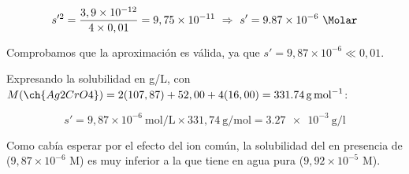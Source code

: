 \begin{exerciseEVAU}
\begin{solu}
        \begin{equation*}
            s'^2 = \dfrac{3,9 \times 10^{-12}}{4 \times 0,01} = 9,75 \times 10^{-11} \ \Rightarrow \ s' = \num{9.87e-6} \ \si{\Molar}
        \end{equation*}

        Comprobamos que la aproximación es válida, ya que \(s' = 9,87 \times 10^{-6} \ll 0,01\).

        Expresando la solubilidad en g/L, con \(M(\ch{Ag2CrO4}) = 2(107,87) + 52,00 + 4(16,00) = \SI{331.74}{\gram\per\mole}\):

        \begin{equation*}
            s' = 9,87 \times 10^{-6} \ \text{mol/L} \times 331,74 \ \si{\gram\per\mole} = \num{3.27e-3} \ \si{\gram\per\litre}
        \end{equation*}

        Como cabía esperar por el efecto del ion común, la solubilidad del  en presencia de  (\(9,87 \times 10^{-6}\) M) es muy inferior a la que tiene en agua pura (\(9,92 \times 10^{-5}\) M).

    \end{solu}
\end{exerciseEVAU}

